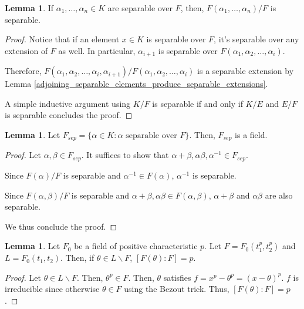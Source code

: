 \documentclass{article}
\theoremstyle{definition}
\newtheorem{lemma}[theorem]{Lemma}
\begin{document}
\begin{lemma}
    If $\alpha_{1}, \ldots, \alpha_{n} \in K$ are separable over $F$, then, $F(\alpha_{1}, \ldots, \alpha_{n})/F$
    is separable.
\end{lemma}
\begin{proof}
    Notice that if an element $x \in K$ is separable over $F$, it's separable over any extension
    of $F$ as well. In particular, $\alpha_{i+1}$ is separable over $F(\alpha_{1},\alpha_{2},\ldots,\alpha_{i})$.
    
    Therefore, $F(\alpha_{1},\alpha_{2},\ldots,\alpha_{i},\alpha_{i+1})/F(\alpha_{1},\alpha_{2},\ldots,\alpha_{i})$
    is a separable extension by Lemma \ref{adjoining_separable_elements_produce_separable_extensions}.

    A simple inductive argument using $K/F$ is separable if and only if $K/E$ and $E/F$ is separable concludes the proof.
\end{proof}

\begin{lemma}\label{separable_part_of_an_extension_is_a_field}
    Let $F_{sep} = \{ \alpha \in K: \alpha \text{ separable over $F$} \}$. Then, $F_{sep}$ is a field.
\end{lemma}
\begin{proof}
    Let $\alpha, \beta \in F_{sep}$. It suffices to show that $\alpha + \beta, \alpha \beta, \alpha^{-1} \in F_{sep}$.

    Since $F(\alpha)/F$ is separable and $\alpha^{-1} \in F(\alpha)$, $\alpha^{-1}$ is separable.

    Since $F(\alpha, \beta)/F$ is separable and $\alpha + \beta, \alpha \beta \in F(\alpha, \beta)$, 
    $\alpha + \beta$ and $ \alpha \beta $ are also separable.

    We thus conclude the proof.
\end{proof}

\begin{lemma}
    Let $F_{0}$ be a field of positive characteristic $p$. Let $F = F_{0}(t_{1}^{p}, t_{2}^{p})$ and 
    $L = F_{0}(t_{1}, t_{2})$. Then, if $\theta \in L \backslash F$, $[F(\theta): F] = p$.
\end{lemma}
\begin{proof}
    Let $\theta \in L \backslash F$. Then, $\theta^{p} \in F$.
    Then, $\theta$ satisfies $f = x^{p} - \theta^{p} = (x - \theta)^{p}$.
    $f$ is irreducible since otherwise $\theta \in F$ using the Bezout trick.
    Thus, $[F(\theta) : F] = p$.
\end{proof}
\end{document}

